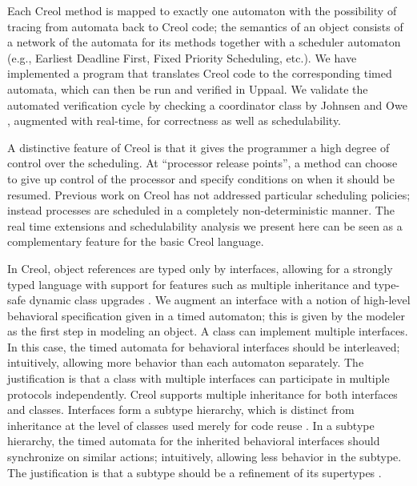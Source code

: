 \documentclass[copyright,creativecommons]{eptcs}
\theoremstyle{definition}
\newcommand{\Uppaal}{{\sc Uppaal}\xspace}
\begin{document}
Each Creol method is mapped to exactly one automaton with the possibility of tracing from automata back to Creol code; the semantics of an object consists of a network of the automata for its methods together with a scheduler automaton (e.g., Earliest Deadline First, Fixed Priority Scheduling, etc.).
We have implemented a program that translates Creol code to the corresponding timed automata, which can then be run and verified in \Uppaal. We validate the automated verification cycle by checking a coordinator class by Johnsen and Owe \cite {johnsen07sosym}, augmented with real-time, for correctness as well as schedulability.




A distinctive feature of Creol is that it gives the programmer a high degree of control over the scheduling. At ``processor release points'', a method can choose to give up control of the processor and specify conditions on when it should be resumed.
Previous work on Creol has not addressed particular scheduling policies; instead processes are scheduled in a completely non-deterministic manner. The real time extensions and schedulability analysis we present here can be seen as a complementary feature for the basic Creol language.

In Creol, object references are typed only by interfaces, allowing for a strongly typed language with support for features such as multiple inheritance and type-safe dynamic class upgrades \cite{yu06fmoods}. We augment an interface with a notion of high-level behavioral specification given in a timed automaton; this is given by the modeler as the first step in modeling an object. A class can implement multiple interfaces. In this case, the timed automata for behavioral interfaces should be interleaved; intuitively, allowing more behavior than each automaton separately. The justification is that a class with multiple interfaces can participate in multiple protocols independently. Creol supports multiple inheritance for both interfaces and classes.  Interfaces form a subtype hierarchy, which is distinct from inheritance at the level of classes used merely for code reuse \cite{JohnsenOY06}. In a subtype hierarchy, the timed automata for the inherited behavioral interfaces should synchronize on similar actions; intuitively, allowing less behavior in the subtype. The justification is that a subtype should be a refinement of its supertypes \cite{PR94}.
\end{document}

